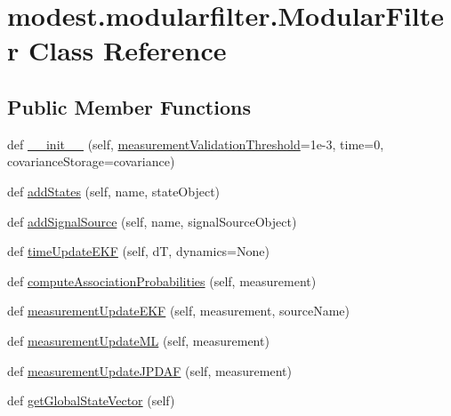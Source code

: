\hypertarget{classmodest_1_1modularfilter_1_1ModularFilter}{}\section{modest.\+modularfilter.\+Modular\+Filter Class Reference}
\label{classmodest_1_1modularfilter_1_1ModularFilter}
\subsection*{Public Member Functions}
\begin{DoxyCompactItemize}
\item 
def \hyperlink{classmodest_1_1modularfilter_1_1ModularFilter_a20bc12664d580ca75518948229c10d13}{\+\_\+\+\_\+init\+\_\+\+\_\+} (self, \hyperlink{classmodest_1_1modularfilter_1_1ModularFilter_af91295c2d8f45afe04386215b5fa39aa}{measurement\+Validation\+Threshold}=1e-\/3, time=0, covariance\+Storage=\textquotesingle{}covariance\textquotesingle{})
\item 
def \hyperlink{classmodest_1_1modularfilter_1_1ModularFilter_a6363266b6fbd79b2cb8071c853af60a0}{add\+States} (self, name, state\+Object)
\item 
def \hyperlink{classmodest_1_1modularfilter_1_1ModularFilter_a6833080d980ec89769625721fa8e103d}{add\+Signal\+Source} (self, name, signal\+Source\+Object)
\item 
def \hyperlink{classmodest_1_1modularfilter_1_1ModularFilter_a7487bb7b6cad0d3af34c100d14e2e0a8}{time\+Update\+E\+KF} (self, dT, dynamics=None)
\item 
def \hyperlink{classmodest_1_1modularfilter_1_1ModularFilter_a39d5e1ab6cb950e4854eb909c338372c}{compute\+Association\+Probabilities} (self, measurement)
\item 
def \hyperlink{classmodest_1_1modularfilter_1_1ModularFilter_a493ccf6845ed800d565f1d26d063592c}{measurement\+Update\+E\+KF} (self, measurement, source\+Name)
\item 
def \hyperlink{classmodest_1_1modularfilter_1_1ModularFilter_af1a7d5a4e219c494de176f94997ae110}{measurement\+Update\+ML} (self, measurement)
\item 
def \hyperlink{classmodest_1_1modularfilter_1_1ModularFilter_ac3a26e2a7672ceedf00c48723104d55c}{measurement\+Update\+J\+P\+D\+AF} (self, measurement)
\item 
def \hyperlink{classmodest_1_1modularfilter_1_1ModularFilter_a11fd7a3b3bcd145f32190f53462c974a}{get\+Global\+State\+Vector} (self)

\end{DoxyCompactItemize}
